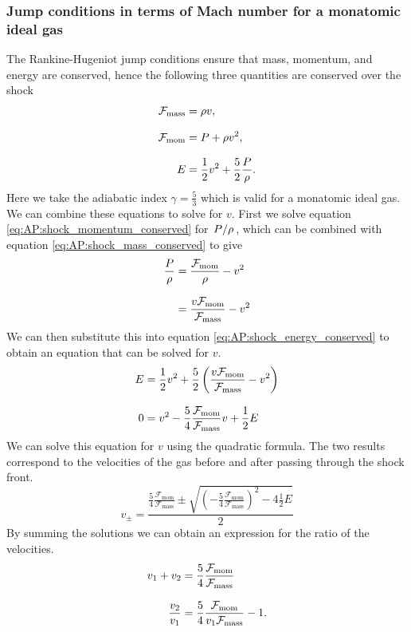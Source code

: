 \subsubsection{Jump conditions in terms of Mach number for a monatomic ideal gas}
The Rankine-Hugeniot jump conditions ensure that mass, momentum, and energy are conserved, hence the following three quantities are conserved over the shock
%
\begin{align}
	\mathcal{F}_\text{mass} &= \rho v,
	\label{eq:AP:shock_mass_conserved}
	\linedrop
	\mathcal{F}_\text{mom} &= P + \rho v^2,
	\label{eq:AP:shock_momentum_conserved}
	\linedrop
	E &= \frac{1}{2}v^2 + \frac{5}{2} \frac{P}{\rho}.
	\label{eq:AP:shock_energy_conserved}
\end{align}
Here we take the adiabatic index \(\gamma = \frac{5}{3}\) which is valid for a monatomic ideal gas.
 We can combine these equations to solve for \(v\).
 First we solve equation \ref{eq:AP:shock_momentum_conserved} for \(\flatfrac{P}{\rho}\), which can be combined with equation \ref{eq:AP:shock_mass_conserved} to give
%
\begin{align}
	\frac{P}{\rho} &= \frac{\mathcal{F}_\text{mom}}{\rho} - v^2 
	\linedrop
	&= \frac{v \mathcal{F}_\text{mom}}{\mathcal{F}_\text{mass}} - v^2
\end{align}
%
We can then substitute this into equation \ref{eq:AP:shock_energy_conserved} to obtain an equation that can be solved for \(v\).
%
\begin{align}
	E &= \frac{1}{2} v^2 + \frac{5}{2} \left(\frac{v \mathcal{F}_\text{mom}}{\mathcal{F}_\text{mass}} - v^2\right)		\nonumber
	\linedrop
	0 &= v^2 - \frac{5}{4} \frac{\mathcal{F}_\text{mom}}{\mathcal{F}_\text{mass}} v + \frac{1}{2} E						\nonumber
\end{align}
%
We can solve this equation for \(v\) using the quadratic formula.
 The two results correspond to the velocities of the gas before and after passing through the shock front.
%
\begin{equation}
	v_\pm = \frac{\frac{5}{4} \frac{\mathcal{F}_\text{mom}}{\mathcal{F}_\text{mass}} \pm \sqrt{\left(-\frac{5}{4} \frac{\mathcal{F}_\text{mom}}{\mathcal{F}_\text{mass}}\right)^2 - 4 \frac{1}{2} E}}
				{2}		\nonumber
\end{equation}
%
By summing the solutions we can obtain an expression for the ratio of the velocities.
%
\begin{align}
	v_1 + v_2 &= \frac{5}{4} \frac{\mathcal{F}_\text{mom}}{\mathcal{F}_\text{mass}}		\nonumber
	\linedrop
	\frac{v_2}{v_1} &= \frac{5}{4} \frac{\mathcal{F}_\text{mom}}{v_1 \mathcal{F}_\text{mass}} - 1
	\label{eq:AP:shock_velocity_ratio}.
\end{align}
